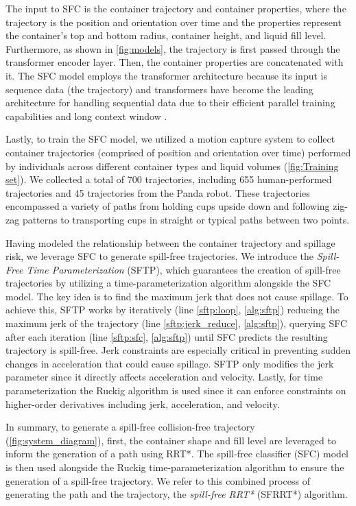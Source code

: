 The input to SFC is the container trajectory and container properties, where the trajectory is the position and orientation over time and the properties represent the container's top and bottom radius, container height, and liquid fill level.
Furthermore, as shown in \cref{fig:models}, the trajectory is first passed through the transformer encoder layer. Then, the container properties are concatenated with it. The SFC model employs the transformer architecture because its input is sequence data (the trajectory) and transformers have become the leading architecture for handling sequential data due to their efficient parallel training capabilities and long context window \cite{huggingfacetransformers}. 

Lastly, to train the SFC model, we utilized a motion capture system to collect container trajectories (comprised of position and orientation over time) performed by individuals across different container types and liquid volumes (\cref{fig:Training set}). We collected a total of 700 trajectories, including 655 human-performed trajectories and 45 trajectories from the Panda robot. These trajectories encompassed a variety of paths from holding cups upside down and following zig-zag patterns to transporting cups in straight or typical paths between two points.


Having modeled the relationship between the container trajectory and spillage risk, we leverage SFC to generate spill-free trajectories. We introduce the \textit{Spill-Free Time Parameterization} (SFTP), which guarantees the creation of spill-free trajectories by utilizing a time-parameterization algorithm alongside the SFC model.
The key idea is to find the maximum jerk that does not cause spillage. To achieve this, SFTP works by iteratively (line \ref{sftp:loop}, \cref{alg:sftp}) reducing the maximum jerk of the trajectory (line \ref{sftp:jerk_reduce}, \cref{alg:sftp}), querying SFC after each iteration (line \ref{sftp:sfc}, \cref{alg:sftp}) until SFC predicts the resulting trajectory is spill-free. Jerk constraints are especially critical in preventing sudden changes in acceleration that could cause spillage. SFTP only modifies the jerk parameter since it directly affects acceleration and velocity. Lastly,  for time parameterization the Ruckig algorithm \cite{ruckig} is used since it can enforce constraints on higher-order derivatives including jerk, acceleration, and velocity.

In summary, to generate a spill-free collision-free trajectory (\cref{fig:system_diagram}), first, the container shape and fill level are leveraged to inform the generation of a path using RRT*. The spill-free classifier (SFC) model is then used alongside the Ruckig time-parameterization algorithm to ensure the generation of a spill-free trajectory. We refer to this combined process of generating the path and the trajectory, the \textit{spill-free RRT*} (SFRRT*) algorithm. 
